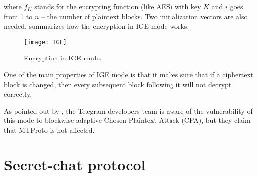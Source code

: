 where $f_K$ stands for the encrypting function (like AES) with key $K$
and $i$ goes from 1 to $n$ $–$ the number of plaintext blocks. Two initialization vectors are also needed.  summarizes how the encryption in IGE mode works.

\begin{figure}[t]
    \centering
    \texttt{[image: IGE]}
    \caption{Encryption in IGE mode.}
    \label{fig:IGE}
\end{figure}

One of the main properties of IGE mode is that it makes sure that if a ciphertext block is changed, then every subsequent block following it will not decrypt correctly.

As pointed out by \cite{Telegram-AFAQ-IGE}, the Telegram developers team is aware of the vulnerability of this mode to blockwise-adaptive Chosen Plaintext Attack (CPA)\cite{IGE-CPA}, but they claim that MTProto is not affected.




\section{Secret-chat protocol}
\label{sec:secret-chat}

